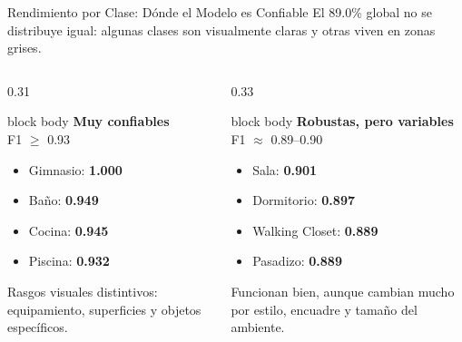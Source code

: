 \documentclass[aspectratio=169]{beamer}
\begin{document}
\begin{frame}{Rendimiento por Clase: D\'onde el Modelo es Confiable}
\footnotesize
\centering
{\small El 89.0\% global no se distribuye igual: algunas clases son visualmente claras y otras viven en zonas grises.}

\vspace{0.16cm}
\begin{columns}[T,totalwidth=\textwidth]
\begin{column}{0.31\textwidth}
\begin{beamercolorbox}[rounded=true,sep=0.12cm,wd=\linewidth]{block body}
\centering
\textbf{Muy confiables}\\[-1pt]
\scriptsize F1 $\geq$ 0.93
\end{beamercolorbox}
\vspace{0.08cm}
\begin{itemize}
\item Gimnasio: \textbf{1.000}
\item Ba\~no: \textbf{0.949}
\item Cocina: \textbf{0.945}
\item Piscina: \textbf{0.932}
\end{itemize}
\vspace{0.05cm}
{\scriptsize Rasgos visuales distintivos: equipamiento, superficies y objetos espec\'ificos.}
\end{column}

\begin{column}{0.33\textwidth}
\begin{beamercolorbox}[rounded=true,sep=0.12cm,wd=\linewidth]{block body}
\centering
\textbf{Robustas, pero variables}\\[-1pt]
\scriptsize F1 $\approx$ 0.89--0.90
\end{beamercolorbox}
\vspace{0.08cm}
\begin{itemize}
\item Sala: \textbf{0.901}
\item Dormitorio: \textbf{0.897}
\item Walking Closet: \textbf{0.889}
\item Pasadizo: \textbf{0.889}
\end{itemize}
\vspace{0.05cm}
{\scriptsize Funcionan bien, aunque cambian mucho por estilo, encuadre y tama\~no del ambiente.}
\end{column}


\end{columns}
\end{frame}
\end{document}
